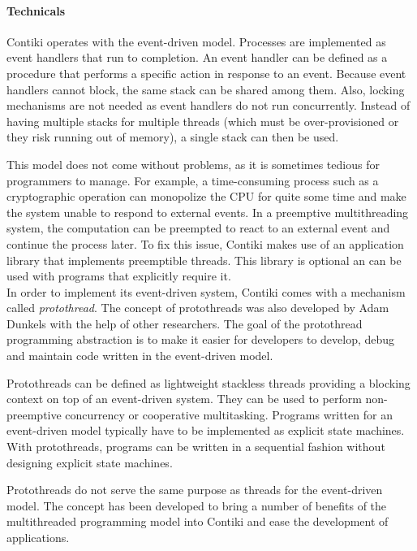 \paragraph{Technicals} Contiki operates with the event-driven model.
Processes are implemented as event handlers that run to completion.
An event handler can be defined as a procedure that performs a specific action in response to an event.
Because event handlers cannot block, the same stack can be shared among them.
Also, locking mechanisms are not needed as event handlers do not run concurrently.
Instead of having multiple stacks for multiple threads (which must be over-provisioned or they risk running out of memory), a single stack can then be used.

This model does not come without problems, as it is sometimes tedious for programmers to manage.
For example, a time-consuming process such as a cryptographic operation can monopolize the CPU for quite some time 
    and make the system unable to respond to external events. 
In a preemptive multithreading system, the computation can be preempted to react to an external event 
    and continue the process later.
To fix this issue, Contiki makes use of an application library that implements preemptible threads.
This library is optional an can be used with programs that explicitly require it.\\

In order to implement its event-driven system, Contiki comes with a mechanism called \textit{protothread}\cite{protothreads}.
The concept of protothreads was also developed by Adam Dunkels with the help of other researchers.
The goal of the protothread programming abstraction is to make it easier for developers to develop, debug and maintain code written in the event-driven model.

Protothreads can be defined as lightweight stackless threads providing a blocking context on top of an event-driven system.
They can be used to perform non-preemptive concurrency or cooperative multitasking.
Programs written for an event-driven model typically have to be implemented as explicit state machines.
With protothreads, programs can be written in a sequential fashion without designing explicit state machines.

Protothreads do not serve the same purpose as threads for the event-driven model.
The concept has been developed to bring a number of benefits of the multithreaded programming model into Contiki
    and ease the development of applications.\\


